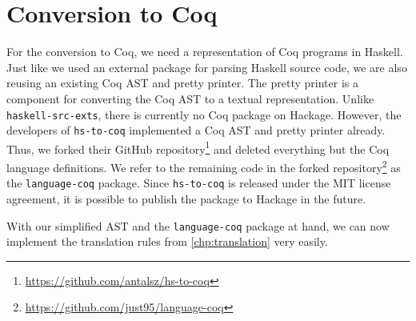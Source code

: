 \section{Conversion to Coq} \label{sec:implementation:coq-ast}
For the conversion to Coq, we need a representation of Coq programs in Haskell.
Just like we used an external package for parsing Haskell source code, we are also reusing an existing Coq AST and pretty printer.
The pretty printer is a component for converting the Coq AST to a textual representation.
Unlike \texttt{haskell-src-exts}, there is currently no Coq package on Hackage.
However, the developers of \texttt{hs-to-coq} implemented a Coq AST and pretty printer already.
Thus, we forked their GitHub repository\footnote{\url{https://github.com/antalsz/hs-to-coq}} and deleted everything but the Coq language definitions.
We refer to the remaining code in the forked repository\footnote{\url{https://github.com/just95/language-coq}} as the \texttt{language-coq} package.
Since \texttt{hs-to-coq} is released under the MIT license agreement, it is possible to publish the package to Hackage in the future.

With our simplified AST and the \texttt{language-coq} package at hand, we can now implement the translation rules from \autoref{chp:translation} very easily.
